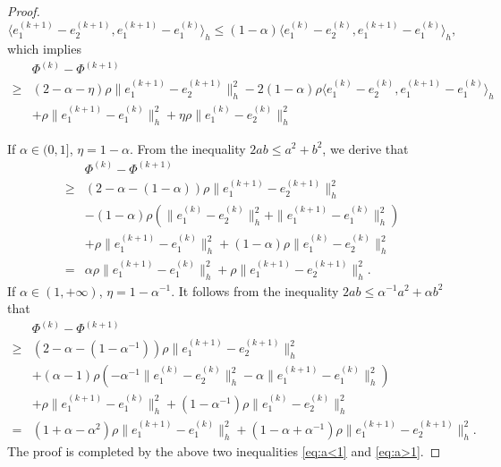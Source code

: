 \begin{proof}
\begin{equation}\label{eq:inequality4}
    \langle e_1^{(k+1)}-e_2^{(k+1)},e_1^{(k+1)}-e_1^{(k)}\rangle_h
    \leq(1-\alpha) \langle e_1^{(k)}-e_2^{(k)},
    e_1^{(k+1)}-e_1^{(k)}\rangle_h,
\end{equation}
which implies
\begin{equation}
\begin{aligned}
    &\Phi^{(k)}-\Phi^{(k+1)}\\
\geq & (2-\alpha-\eta)\rho \|e_1^{(k+1)}-
    e_2^{(k+1)}\|_h^2-2(1-\alpha)\rho \langle e_1^{(k)}-e_2^{(k)},
    e_1^{(k+1)}-e_1^{(k)}\rangle_h\\
    &+\rho \|e_1^{(k+1)}-e_1^{(k)}\|_h^2
    +\eta \rho \|e_1^{(k)}-
    e_2^{(k)}\|_h^2
\end{aligned}
\end{equation}

If $\alpha \in (0,1]$, $\eta=1-\alpha$. From the inequality $2ab\leq a^2+b^2$, we derive that
\begin{equation}\label{eq:a<1}
    \begin{aligned}
    &\Phi^{(k)}-\Phi^{(k+1)}\\
\geq & (2-\alpha-(1-\alpha))\rho \|e_1^{(k+1)}-
    e_2^{(k+1)}\|_h^2\\
    &-(1-\alpha)\rho (\| e_1^{(k)}-e_2^{(k)}\|_h^2+
    \|e_1^{(k+1)}-e_1^{(k)}\|_h^2)\\
    &+\rho \|e_1^{(k+1)}-e_1^{(k)}\|_h^2
    +(1-\alpha) \rho \|e_1^{(k)}-
    e_2^{(k)}\|_h^2\\
    =&\alpha \rho \|e_1^{(k+1)}-e_1^{(k)}\|_h^2+\rho \|e_1^{(k+1)}-
    e_2^{(k+1)}\|_h^2.
\end{aligned}
\end{equation}
If $\alpha \in (1,+\infty)$, $\eta=1-\alpha^{-1}$. It follows from the inequality $2ab\leq \alpha^{-1}a^2+\alpha b^2$ that
\begin{equation}\label{eq:a>1}
\begin{aligned}
&\Phi^{(k)}-\Phi^{(k+1)}\\
\geq &(2-\alpha-(1-\alpha^{-1}))\rho \|e_1^{(k+1)}-
    e_2^{(k+1)}\|_h^2\\
    &+(\alpha-1)\rho (-\alpha^{-1}\| e_1^{(k)}-e_2^{(k)}\|_h^2-
    \alpha \|e_1^{(k+1)}-e_1^{(k)}\|_h^2)\\
    &+\rho \|e_1^{(k+1)}-e_1^{(k)}\|_h^2
    +(1-\alpha^{-1}) \rho \|e_1^{(k)}-
    e_2^{(k)}\|_h^2\\
    =&(1+\alpha-\alpha^2)\rho \|e_1^{(k+1)}-e_1^{(k)}\|_h^2+(1-\alpha+\alpha^{-1})\rho \|e_1^{(k+1)}-
    e_2^{(k+1)}\|_h^2.
\end{aligned}
\end{equation}
The proof is completed by the above two inequalities \eqref{eq:a<1} and \eqref{eq:a>1}.
\end{proof}
